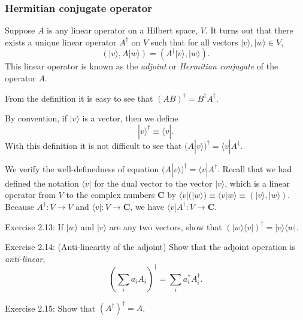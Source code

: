 
\subsubsection{Hermitian conjugate operator}

\begin{definition}
    Suppose $A$ is any linear operator on a Hilbert space, $V$. It turns out that there exists a unique linear operator $A^{\dagger}$ on $V$ such that for all vectors $|v\rangle,|w\rangle \in V$,
$$
(|v\rangle, A|w\rangle)=\left(A^{\dagger}|v\rangle,|w\rangle\right).
$$
This linear operator is known as the \textit{adjoint} or \textit{Hermitian conjugate} of the operator $A$. 
\end{definition}

From the definition it is easy to see that $(A B)^{\dagger}=B^{\dagger} A^{\dagger}$. 

By convention, if $|v\rangle$ is a vector, then we define 
$$
|v\rangle^{\dagger} \equiv\langle v|. 
$$
With this definition it is not difficult to see that $(A|v\rangle)^{\dagger}=\langle v| A^{\dagger}.$

\begin{remark}
    We verify the well-definedness of equation $(A|v\rangle)^{\dagger}=\langle v| A^{\dagger}$. Recall that we had defined the notation $\langle v|$ for the dual vector to the vector $|v\rangle$, which is a linear operator from $V$ to the complex numbers $\mathbf{C}$ by $\langle v|(|w\rangle) \equiv\langle v | w\rangle \equiv(|v\rangle,|w\rangle).$ Because $A^{\dagger} \colon V \to V$ and $\langle v | \colon V \to \mathbf{C}$, we have $\langle v| A^{\dagger}\colon V \to \mathbf{C}.$
\end{remark}

\begin{exercise}
Exercise 2.13: If $|w\rangle$ and $|v\rangle$ are any two vectors, show that $(|w\rangle\langle v|)^{\dagger}=|v\rangle\langle w|$.
\end{exercise}

\begin{exercise}
Exercise 2.14: (Anti-linearity of the adjoint) Show that the adjoint operation is \textit{anti-linear},
$$
\left(\sum_{i} a_{i} A_{i}\right)^{\dagger}=\sum_{i} a_{i}^{*} A_{i}^{\dagger}.
$$
\end{exercise}

\begin{exercise}
Exercise 2.15: Show that $\left(A^{\dagger}\right)^{\dagger}=A$.
\end{exercise}

